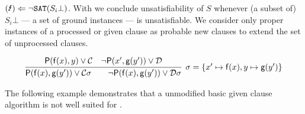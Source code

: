 \begin{remark}
\( \text{(\Lightning)} \Leftarrow \UNSAT(S_i\bot) \).
With \InstGen{} we conclude unsatisfiability of \( S \) whenever (a subset of) \( S_i\bot \) --- a set of ground instances --- is unsatisfiable.
We consider only proper instances of a processed or given clause
as probable new clauses to extend the set of unprocessed clauses.
\end{remark}
\vspace{-1em}
\begin{gather*}
	\infer[\sigma=\{ x'\mapsto\mf(x), y\mapsto\mg(y') \}]{
		\mP(\mf(x),\mg(y')) \lor\mcC\sigma
		\qquad
		\lnot\mP(\mf(x),\mg(y'))\lor\mcD\sigma
	}{
		\mP(\mf(x), y) \lor \mcC & \lnot\mP(x',\mg(y')) \lor \mcD
	}
\end{gather*}

The following example demonstrates that a unmodified basic given clause algorithm is not well suited for \InstGen.

